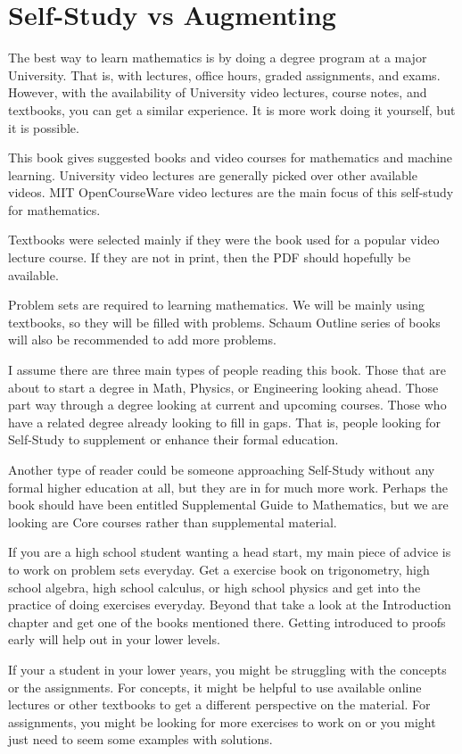 \documentclass[openany,10pt]{book}
\begin{document}
\section*{Self-Study vs Augmenting}
The best way to learn mathematics is by doing a degree program at a major University.  That is, with lectures, office hours, graded assignments, and exams.  However, with the availability of University video lectures, course notes, and textbooks, you can get a similar experience.  It is more work doing it yourself, but it is possible.

This book gives suggested books and video courses for mathematics and machine learning.  University video lectures are generally picked over other available videos.  MIT OpenCourseWare video lectures are the main focus of this self-study for mathematics.

Textbooks were selected mainly if they were the book used for a popular video lecture course.  If they are not in print, then the PDF should hopefully be available.

Problem sets are required to learning mathematics.  We will be mainly using textbooks, so they will be filled with problems.  Schaum Outline series of books will also be recommended to add more problems.

I assume there are three main types of people reading this book.  Those that are about to start a degree in Math, Physics, or Engineering looking ahead.  Those part way through a degree looking at current and upcoming courses.  Those who have a related degree already looking to fill in gaps.  That is, people looking for Self-Study to supplement or enhance their formal education.

Another type of reader could be someone approaching Self-Study without any formal higher education at all, but they are in for much more work.  Perhaps the book should have been entitled Supplemental Guide to Mathematics, but we are looking are Core courses rather than supplemental material.

If you are a high school student wanting a head start, my main piece of advice is to work on problem sets everyday.  Get a exercise book on trigonometry, high school algebra, high school calculus, or high school physics and get into the practice of doing exercises everyday.  Beyond that take a look at the Introduction chapter and get one of the books mentioned there.  Getting introduced to proofs early will help out in your lower levels.

If your a student in your lower years, you might be struggling with the concepts or the assignments.  For concepts, it might be helpful to use available online lectures or other textbooks to get a different perspective on the material.  For assignments, you might be looking for more exercises to work on or you might just need to seem some examples with solutions.
\end{document}
